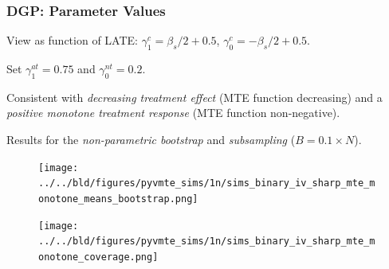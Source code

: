 \documentclass[11pt, aspectratio=169]{beamer}
\begin{document}
\begin{frame}
    \frametitle{DGP\@: Parameter Values}

    View as function of LATE\@: $\gamma_1^c = \beta_s/2 + 0.5$, $\gamma_0^c = -\beta_s/2 + 0.5$.

    \vspace{0.5cm}

    Set $\gamma_1^{at} = 0.75$ and $\gamma_0^{nt} = 0.2$.

    \vspace{0.5cm}

    Consistent with \textit{decreasing treatment effect} (MTE function decreasing) and a \textit{positive monotone treatment response} (MTE function non-negative).

    \vspace{0.5cm}

    Results for the \textit{non-parametric bootstrap} and \textit{subsampling} ($B = 0.1\times N$).

\end{frame}

\begin{frame}

    \begin{figure}
        \texttt{[image: ../../bld/figures/pyvmte\_sims/1n/sims\_binary\_iv\_sharp\_mte\_monotone\_means\_bootstrap.png]}
    \end{figure}

\end{frame}




\begin{frame}

    \begin{figure}
        \texttt{[image: ../../bld/figures/pyvmte\_sims/1n/sims\_binary\_iv\_sharp\_mte\_monotone\_coverage.png]}
    \end{figure}

\end{frame}
\end{document}
